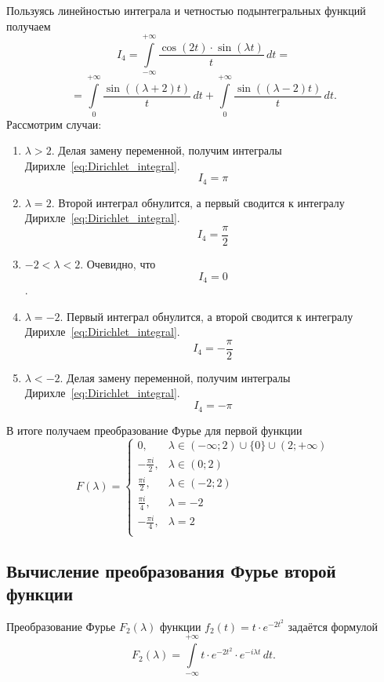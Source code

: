\documentclass[a4paper, 11pt]{article}
\newcommand{\myint}[4]{\int\limits_{#1}^{#2}#3\,d#4}
\begin{document}
\begin{enumerate}
$$                $$
                Пользуясь линейностью интеграла и четностью подынтегральных функций получаем
                $$
                    I_4 = \myint{-\infty}{+\infty}{\frac{\cos(2t)\cdot \sin(\lambda t)}{t}} {t} =
                $$
                $$
                    = \myint{0}{+\infty}{\frac{\sin((\lambda+2)t)}{t}} {t} + \myint{0}{+\infty}{\frac{\sin((\lambda-2)t)}{t}} {t}.
                $$
                Рассмотрим случаи:
                    \begin{enumerate}
                        \item $\lambda > 2$. Делая замену переменной, получим интегралы Дирихле~\eqref{eq:Dirichlet_integral}. $$I_4 = \pi$$
                        \item $\lambda = 2$. Второй интеграл обнулится, а первый сводится к интегралу Дирихле~\eqref{eq:Dirichlet_integral}. $$I_4 = \frac{\pi}{2}$$
                        \item $-2 < \lambda < 2 $. Очевидно, что $$I_4 = 0$$.
                        \item $\lambda = -2$. Первый интеграл обнулится, а второй сводится к интегралу Дирихле~\eqref{eq:Dirichlet_integral}. $$I_4 = -\frac{\pi}{2}$$
                        \item $\lambda < -2$. Делая замену переменной, получим интегралы Дирихле~\eqref{eq:Dirichlet_integral}. $$I_4 = -\pi$$
                    \end{enumerate}
        \end{enumerate}
        
        В итоге получаем преобразование Фурье для первой функции
        \begin{equation}
            F(\lambda) = 
            \begin{cases}
                0,                 & \lambda \in (-\infty ; 2)\cup \{ 0 \} \cup (2 ; +\infty) \\
                -\frac{\pi i}{2},  & \lambda \in (0 ; 2)\\
                \frac{\pi i}{2},   & \lambda \in (-2; 2) \\
                \frac{\pi i}{4},   & \lambda = -2 \\
                -\frac{\pi i}{4},  & \lambda = 2 \\
            \end{cases}
        \end{equation}
    
    \subsection{Вычисление преобразования Фурье второй функции}
        Преобразование Фурье $F_2(\lambda)$ функции $f_2(t) = t \cdot e^{-2t^2}$ задаётся формулой
        $$
            F_2(\lambda) = \myint{-\infty}{+\infty}{t \cdot e^{-2t^2} \cdot e^{-i\lambda  t}}{t}.
        $$
        
\end{document}
